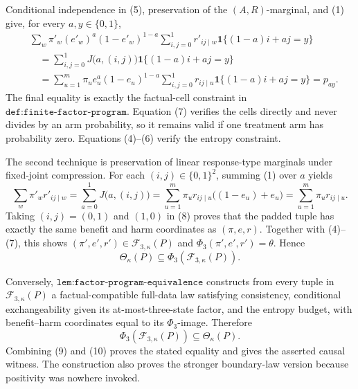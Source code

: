 Conditional independence in (5), preservation of the \((A,R)\)-marginal,
and (1) give, for every \(a,y\in\{0,1\}\),
\[
\begin{aligned}
 &\sum_w\pi'_w(e'_w)^a(1-e'_w)^{1-a}
   \sum_{i,j=0}^1r'_{ij\mid w}
      \mathbf 1\{(1-a)i+aj=y\}\\
 &\quad=\sum_{i,j=0}^1J\bigl(a,(i,j)\bigr)
      \mathbf 1\{(1-a)i+aj=y\}\\
 &\quad=\sum_{u=1}^m\pi_u e_u^a(1-e_u)^{1-a}
   \sum_{i,j=0}^1r_{ij\mid u}
      \mathbf 1\{(1-a)i+aj=y\}
 =p_{ay}.
 \tag{7}
\end{aligned}
\]
The final equality is exactly the factual-cell constraint in
\(\texttt{def:finite-factor-program}\).  Equation (7) verifies the cells
directly and never divides by an arm probability, so it remains valid if
one treatment arm has probability zero.  Equations (4)--(6) verify the
entropy constraint.

The second technique is preservation of linear response-type marginals
under fixed-joint compression.  For each \((i,j)\in\{0,1\}^2\), summing
(1) over \(a\) yields
\[
 \sum_w\pi'_w r'_{ij\mid w}
 =\sum_{a=0}^1J\bigl(a,(i,j)\bigr)
 =\sum_{u=1}^m\pi_u r_{ij\mid u}
      \bigl((1-e_u)+e_u\bigr)
 =\sum_{u=1}^m\pi_u r_{ij\mid u}.
 \tag{8}
\]
Taking \((i,j)=(0,1)\) and \((1,0)\) in (8) proves that the padded tuple
has exactly the same benefit and harm coordinates as \((\pi,e,r)\).
Together with (4)--(7), this shows
\((\pi',e',r')\in\mathcal F_{3,\kappa}(P)\) and
\(\Phi_3(\pi',e',r')=\theta\).  Hence
\[
 \Theta_\kappa(P)\subseteq\Phi_3(\mathcal F_{3,\kappa}(P)).
 \tag{9}
\]

Conversely, \(\texttt{lem:factor-program-equivalence}\) constructs from
every tuple in \(\mathcal F_{3,\kappa}(P)\) a factual-compatible full-data
law satisfying consistency, conditional exchangeability given its
at-most-three-state factor, and the entropy budget, with benefit--harm
coordinates equal to its \(\Phi_3\)-image.  Therefore
\[
 \Phi_3(\mathcal F_{3,\kappa}(P))\subseteq\Theta_\kappa(P).
 \tag{10}
\]
Combining (9) and (10) proves the stated equality and gives the asserted
causal witness.  The construction also proves the stronger boundary-law
version because positivity was nowhere invoked.